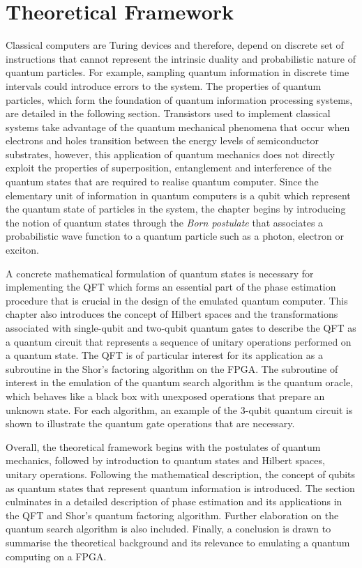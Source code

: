\chapter{\label{ch:theoretical_framework} Theoretical Framework}

Classical computers are Turing devices and therefore, depend on discrete set of instructions that cannot represent the intrinsic duality and probabilistic nature of quantum particles. For example, sampling quantum information in discrete time intervals could introduce errors to the system. The properties of quantum particles, which form the foundation of quantum information processing systems, are detailed in the following section. Transistors used to implement classical systems take advantage of the quantum mechanical phenomena that occur when electrons and holes transition between the energy levels of semiconductor substrates, however, this application of quantum mechanics does not directly exploit the properties of superposition, entanglement and interference of the quantum states that are required to realise quantum computer. Since the elementary unit of information in quantum computers is a qubit which represent the quantum state of particles in the system, the chapter begins by introducing the notion of quantum states through the \textit{Born postulate} that associates a probabilistic wave function to a quantum particle such as a photon, electron or exciton. 

A concrete mathematical formulation of quantum states is necessary for implementing the QFT which forms an essential part of the phase estimation procedure that is crucial in the design of the emulated quantum computer. This chapter also introduces the concept of Hilbert spaces and the transformations associated with single-qubit and two-qubit quantum gates to describe the QFT as a quantum circuit that represents a sequence of unitary operations performed on a quantum state. The QFT is of particular interest for its application as a subroutine in the Shor's factoring algorithm on the FPGA. The subroutine of interest in the emulation of the quantum search algorithm is the quantum oracle, which behaves like a black box with unexposed operations that prepare an unknown state. For each algorithm, an example of the 3-qubit quantum circuit is shown to illustrate the quantum gate operations that are necessary.

Overall, the theoretical framework begins with the postulates of quantum mechanics, followed by introduction to quantum states and Hilbert spaces, unitary operations. Following the mathematical description, the concept of qubits as quantum states that represent quantum information is introduced. The section culminates in a detailed description of phase estimation and its applications in the QFT and Shor's quantum factoring algorithm. Further elaboration on the quantum search algorithm is also included. Finally, a conclusion is drawn to summarise the theoretical background and its relevance to emulating a quantum computing on a FPGA. 

